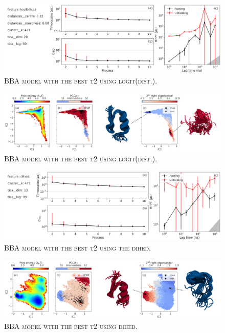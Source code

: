 \documentclass{article}
\begin{document}
\begin{figure}
    \centering
    \includegraphics[width=\columnwidth]{SI_figures/BBA_24_SI-1.png}
    \caption{\textsc{BBA model with the best t2 using logit(dist.).}}
    \label{si_fig:BBA_24_1}
\end{figure}

\begin{figure}
    \centering
    \includegraphics[width=\columnwidth]{SI_figures/BBA_24_SI-2.png}
    \caption{\textsc{BBA model with the best t2 using logit(dist.).}}
    \label{si_fig:BBA_24_2}
\end{figure}

\begin{figure}
    \centering
    \includegraphics[width=\columnwidth]{SI_figures/BBA_6_SI-1.png}
    \caption{\textsc{BBA model with the best t2 using the dihed.}}
    \label{si_fig:BBA_6_1}
\end{figure}

\begin{figure}
    \centering
    \includegraphics[width=\columnwidth]{SI_figures/BBA_6_SI-2.png}
    \caption{\textsc{BBA model with the best t2 using dihed.}}
    \label{si_fig:BBA_6_2}
\end{figure}
\end{document}
